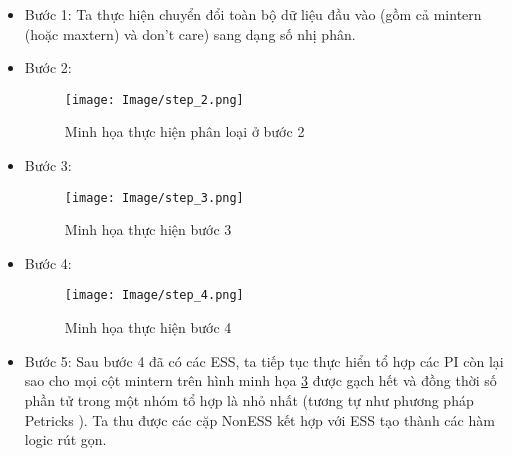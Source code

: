 \documentclass[titlepage]{article} %
\begin{document}
\begin{itemize} \vspace{-0.5cm}
    \item Bước 1: Ta thực hiện chuyển đổi toàn bộ dữ liệu đầu vào (gồm cả mintern (hoặc maxtern) và don't care) sang dạng số nhị phân.
    \item Bước 2:
    \begin{figure}[H] 
	\centering
	\texttt{[image: Image/step\_2.png]}
	\caption[Minh họa thực hiện phân loại ở bước 2]{\centering Minh họa thực hiện phân loại ở bước 2} \label{img:step_2}
    \end{figure} \vspace{-0.5cm} 
    
    \item Bước 3: 
    \begin{figure}[H] 
	\centering
	\texttt{[image: Image/step\_3.png]}
	\caption[Minh họa thực hiện bước 3]{\centering Minh họa thực hiện bước 3} \label{img:step_3}
    \end{figure} \vspace{-0.5cm} 
    
    \item Bước 4: 
    \begin{figure}[H] 
	\centering
	\texttt{[image: Image/step\_4.png]}
	\caption[Minh họa thực hiện bước 4]{\centering Minh họa thực hiện bước 4} \label{img:step_4}
    \end{figure} \vspace{-0.5cm}  
    
    \item Bước 5: Sau bước 4 đã có các ESS, ta tiếp tục thực hiển tổ hợp các PI còn lại sao cho mọi cột mintern trên hình minh họa \ref{img:step_4} được gạch hết và đồng thời số phần tử trong một nhóm tổ hợp là nhỏ nhất (tương tự như phương pháp Petricks \cite{Petrick:2020}). Ta thu được các cặp NonESS kết hợp với ESS tạo thành các hàm logic rút gọn.
    
    
\end{itemize}
\end{document}
